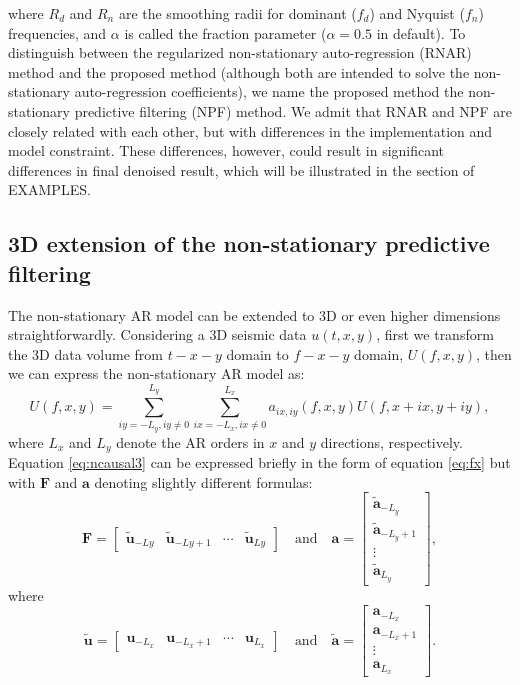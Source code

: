 where $R_d$ and $R_n$ are the smoothing radii for dominant ($f_d$) and Nyquist ($f_n$) frequencies, and $\alpha$ is called the fraction parameter ($\alpha=0.5$ in default). To distinguish between the regularized non-stationary auto-regression (RNAR) method and the proposed method (although both are intended to solve the non-stationary auto-regression coefficients), we name the proposed method the non-stationary predictive filtering (NPF) method. We admit that RNAR and NPF are closely related with each other, but with differences in the implementation and model constraint. These differences, however, could result in significant differences in final denoised result, which will be illustrated in the section of EXAMPLES. 

\subsection{3D extension of the non-stationary predictive filtering}
The non-stationary AR model can be extended to 3D or even higher dimensions straightforwardly. Considering a 3D seismic data $u(t,x,y)$, first we transform the 3D data volume from $t-x-y$ domain to $f-x-y$ domain, $U(f,x,y)$, then we can express the non-stationary AR model as:
\begin{equation}
\label{eq:ncausal3}
U(f,x,y)=\sum_{iy=-L_y,iy\ne 0}^{L_y}\sum_{ix=-L_x,ix\ne 0}^{L_x}a_{ix,iy}(f,x,y)U(f,x+ix,y+iy),
\end{equation}
where $L_x$ and $L_y$ denote the AR orders in $x$ and $y$ directions, respectively. 
Equation \ref{eq:ncausal3} can be expressed briefly in the form of equation \ref{eq:fx} but with $\mathbf{F}$ and $\mathbf{a}$ denoting slightly different formulas:
\begin{equation}
\label{eq:fx3d}
\mathbf{F}=\left[\begin{array}{cccc}
\tilde{\mathbf{u}}_{-Ly} &\tilde{\mathbf{u}}_{-Ly+1}&\cdots&\tilde{\mathbf{u}}_{Ly}
\end{array}\right] \quad \text{and}\quad \mathbf{a}=\left[\begin{array}{c}
\tilde{\mathbf{a}}_{-L_y}\\
\tilde{\mathbf{a}}_{-L_y+1}\\
\vdots\\
\tilde{\mathbf{a}}_{L_y}
\end{array}\right],
\end{equation}
where
\begin{equation}
\label{eq:fx3d}
\tilde{\mathbf{u}}=\left[\begin{array}{cccc}
\mathbf{u}_{-{L_x}} &\mathbf{u}_{-L_x+1}&\cdots&\mathbf{u}_{L_x}
\end{array}\right] \quad \text{and}\quad \tilde{\mathbf{a}}=\left[\begin{array}{c}
\mathbf{a}_{-L_x}\\
\mathbf{a}_{-L_x+1}\\
\vdots\\
\mathbf{a}_{L_x}
\end{array}\right].
\end{equation}
